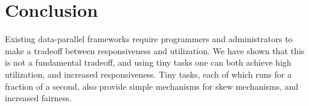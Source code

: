\section{Conclusion}
Existing data-parallel frameworks require programmers and administrators
to make a tradeoff between responsiveness and utilization. We have shown
that this is not a fundamental tradeoff, and using tiny tasks one can both
achieve high utilization, and increased responsiveness. Tiny tasks, each of
which runs for a fraction of a second, also provide simple mechanisms for 
skew mechanisms, and increased fairness.
